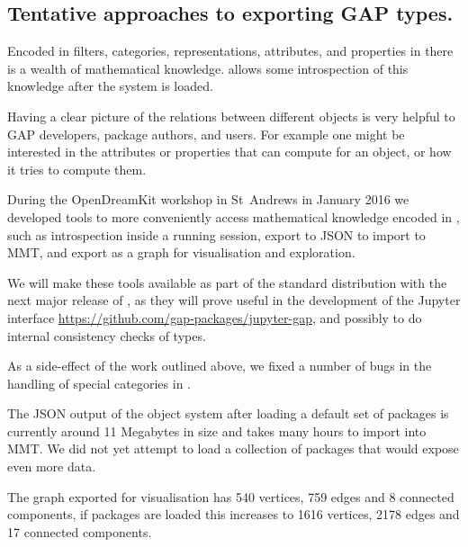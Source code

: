 
\subsection{Tentative approaches to exporting GAP types.}\label{gap-types-export}

Encoded in filters, categories, representations, attributes, and properties in \GAP
there is a wealth of mathematical knowledge. \GAP allows some introspection
of this knowledge after the system is loaded.

Having a clear picture of the relations between different objects is 
very helpful to GAP developers, package authors, and users.
For example one might be interested in the attributes or properties that \GAP can
compute for an object, or how it tries to compute them.

During the OpenDreamKit workshop in St~Andrews in January 2016 we developed
tools to more conveniently access mathematical knowledge encoded in \GAP,
such as introspection inside a running \GAP session, export to JSON to import
to MMT, and export as a graph for visualisation and exploration.

We will make these tools available as part of the standard \GAP distribution with the next
major release of \GAP, as they will prove useful in the development of the \GAP Jupyter interface
\url{https://github.com/gap-packages/jupyter-gap}, and possibly to do
internal consistency checks of \GAP types.

As a side-effect of the work outlined above, we fixed a number of bugs in the handling of
special categories in \GAP.

The JSON output of the \GAP object system after loading a default set of packages is currently
around 11 Megabytes in size and takes many hours to import into MMT. We did not yet attempt to
load a collection of \GAP packages that would expose even more data.

The graph exported for visualisation has 540 vertices, 759 edges and 8 connected components, if
packages are loaded this increases to 1616 vertices, 2178 edges and 17 connected components.

